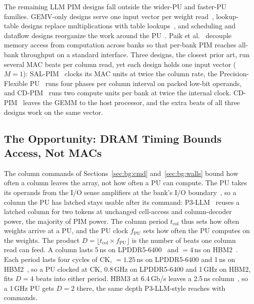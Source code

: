 The remaining LLM PIM designs fall outside the wider-PU and faster-PU families. GEMV-only designs serve one input
vector per weight read~\cite{newton,cent,pimgpt}, lookup-table designs replace multiplications with table
lookups~\cite{localut,pimpal,pimdl}, and scheduling and dataflow designs reorganize the work around the
PU~\cite{pimba,paise,splitsync,dots,pimphony}. Paik et al.~\cite{paik2022} decouple memory access from computation
across banks so that per-bank PIM reaches all-bank throughput on a standard interface. Three designs, the closest prior
art, run several MAC beats per column read, yet each design holds one input vector ($M = 1$): SAL-PIM~\cite{salpim}
clocks its MAC units at twice the column rate, the Precision-Flexible PU~\cite{pfpu} runs four phases per column
interval on packed low-bit operands, and CD-PIM~\cite{cdpim} runs two compute units per bank at twice the internal
clock. CD-PIM~\cite{cdpim} leaves the GEMM to the host processor, and the extra beats of all three designs work on the
same vector.

\subsection{The Opportunity: DRAM Timing Bounds Access, Not MACs}
\label{sec:bg:depth}

The column commands of Sections~\ref{sec:bg:cmd} and~\ref{sec:bg:walls} bound how often a column leaves the array, not
how often a PU can compute. The PU takes its operands from the I/O sense amplifiers at the bank's I/O
boundary~\cite{hbmpim}, so a column the PU has latched stays usable after its command: P3-LLM~\cite{p3llm} reuses a
latched column for two tokens at unchanged cell-access and column-decoder power, the majority of PIM power. The column
period $t_\mathrm{col}$ thus sets how often weights arrive at a PU, and the PU clock $f_\mathrm{PU}$ sets how often the
PU computes on the weights. The product $D = \lfloor t_\mathrm{col} \times f_\mathrm{PU} \rfloor$ is the number of
beats one column read can feed. A column lasts 5\,ns on LPDDR5-6400~\cite{lpspec,ramulator2} and \tccdl${}=4$\,ns on
HBM2~\cite{hbmpim,p3llm}. Each period lasts four cycles of CK, \tck${}= 1.25$\,ns on LPDDR5-6400
and 1\,ns on HBM2~\cite{hbmpim,p3llm}, so a PU clocked at CK, 0.8\,GHz on LPDDR5-6400 and 1\,GHz on HBM2, fits
$D = 4$ beats into either period. HBM3 at 6.4\,Gb/s leaves a 2.5\,ns
column~\cite{ramulator2,p3llm}, so a 1\,GHz PU gets $D = 2$ there, the same depth P3-LLM-style reaches with commands.

